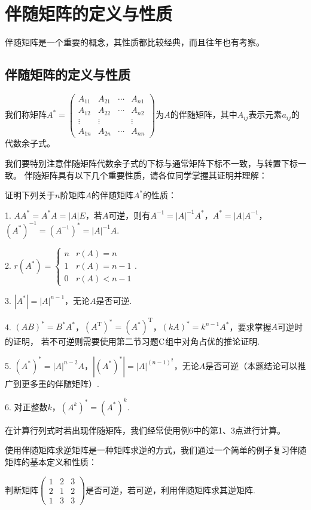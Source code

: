 \section{伴随矩阵的定义与性质}
伴随矩阵是一个重要的概念，其性质都比较经典，而且往年也有考察。
\subsection{伴随矩阵的定义与性质}
\begin{definition}
	我们称矩阵$A^*=\begin{pmatrix}
		A_{11} & A_{21} & \cdots & A_{n1} \\
		A_{12} & A_{22} & \cdots & A_{n2} \\
		\vdots & \vdots &        & \vdots \\
		A_{1n} & A_{2n} & \cdots & A_{nn}
	\end{pmatrix}$为$A$的伴随矩阵，其中$A_{ij}$表示元素$a_{ij}$的代数余子式。
\end{definition}
我们要特别注意伴随矩阵代数余子式的下标与通常矩阵下标不一致，与转置下标一致。
伴随矩阵具有以下几个重要性质，请各位同学掌握其证明并理解：
\begin{example}
	证明下列关于$n$阶矩阵$A$的伴随矩阵$A^*$的性质：

	\textup{1}. $AA^*=A^*A=|A|E$，若$A$可逆，则有$A^{-1}=|A|^{-1}A^*$，$A^*=|A|A^{-1}$，$(A^*)^{-1}=(A^{-1})^*=|A|^{-1}A$.

	\textup{2}. $r(A^*)=\begin{cases}
		n & r(A)=n \\ 1 & r(A)=n-1 \\ 0 & r(A) < n-1
	\end{cases}$.

	\textup{3}. $|A^*|=|A|^{n-1}$，无论$A$是否可逆.

	\textup{4}. $(AB)^*=B^*A^*$，$(A^\mathrm{T})^*=(A^*)^\mathrm{T}$，$(kA)^*=k^{n-1}A^*$，要求掌握$A$可逆时的证明，
	若不可逆则需要使用第二节习题$\textup{C}$组中对角占优的推论证明.

	\textup{5}. $(A^*)^*=|A|^{n-2}A$，$|(A^*)^*|=|A|^{(n-1)^2}$，无论$A$是否可逆（本题结论可以推广到更多重的伴随矩阵）.

	\textup{6}. 对正整数$k$，$(A^k)^*=(A^*)^k$.
\end{example}
在计算行列式时若出现伴随矩阵，我们经常使用例6中的第1、3点进行计算。

使用伴随矩阵求逆矩阵是一种矩阵求逆的方式，我们通过一个简单的例子复习伴随矩阵的基本定义和性质：
\begin{example}
	判断矩阵$\begin{pmatrix}
		1 & 2 & 3 \\ 2 & 1 & 2 \\ 1 & 3 & 3
	\end{pmatrix}$是否可逆，若可逆，利用伴随矩阵求其逆矩阵.
\end{example}

